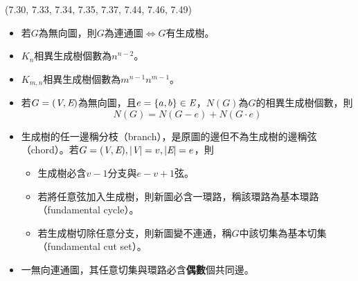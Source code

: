 \item \begin{theorem}{(7.30, 7.33, 7.34, 7.35, 7.37, 7.44, 7.46, 7.49)} \quad\quad
    \begin{itemize}
        \item 若$G$為無向圖，則$G$為連通圖$\iff$$G$有生成樹。
        \item $K_n$相異生成樹個數為$n^{n - 2}$。
        \item $K_{m, n}$相異生成樹個數為$m^{n - 1}n^{m - 1}$。
        \item 若$G = (\textit{V}, \textit{E})$為無向圖，且$e = \{a, b\} \in \textit{E}$，$N(G)$為$G$的相異生成樹個數，則\begin{equation}
            N(G) = N(G - e) + N(G \cdot e)
        \end{equation}
        \item 生成樹的任一邊稱分枝（branch），是原圖的邊但不為生成樹的邊稱弦（chord）。若$G = (\textit{V}, \textit{E}), |\textit{V}| = v, |\textit{E}| = e$，則\begin{itemize}
            \item 生成樹必含$v - 1$分支與$e - v + 1$弦。
            \item 若將任意弦加入生成樹，則新圖必含一環路，稱該環路為基本環路（fundamental cycle）。
            \item 若生成樹切除任意分支，則新圖變不連通，稱$G$中該切集為基本切集（fundamental cut set）。
        \end{itemize}
        \item 一無向連通圖，其任意切集與環路必含\textbf{偶數}個共同邊。
    \end{itemize}
\end{theorem}
